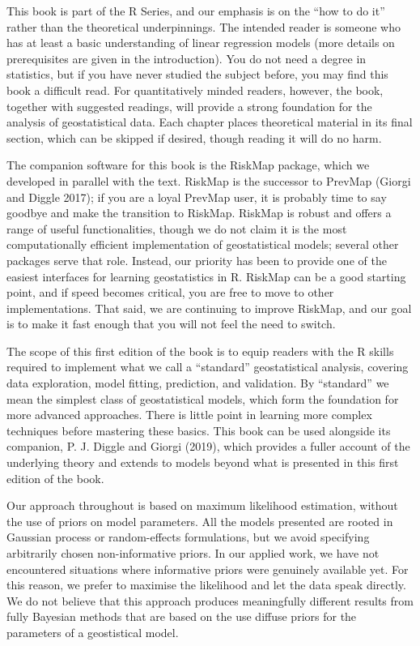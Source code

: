 \documentclass[
  letterpaper,
]{krantz}
\begin{document}
This book is part of the R Series, and our emphasis is on the ``how to
do it'' rather than the theoretical underpinnings. The intended reader
is someone who has at least a basic understanding of linear regression
models (more details on prerequisites are given in the introduction).
You do not need a degree in statistics, but if you have never studied
the subject before, you may find this book a difficult read. For
quantitatively minded readers, however, the book, together with
suggested readings, will provide a strong foundation for the analysis of
geostatistical data. Each chapter places theoretical material in its
final section, which can be skipped if desired, though reading it will
do no harm.

The companion software for this book is the RiskMap package, which we
developed in parallel with the text. RiskMap is the successor to PrevMap
(Giorgi and Diggle 2017); if you are a loyal PrevMap user, it is
probably time to say goodbye and make the transition to RiskMap. RiskMap
is robust and offers a range of useful functionalities, though we do not
claim it is the most computationally efficient implementation of
geostatistical models; several other packages serve that role. Instead,
our priority has been to provide one of the easiest interfaces for
learning geostatistics in R. RiskMap can be a good starting point, and
if speed becomes critical, you are free to move to other
implementations. That said, we are continuing to improve RiskMap, and
our goal is to make it fast enough that you will not feel the need to
switch.

The scope of this first edition of the book is to equip readers with the
R skills required to implement what we call a ``standard''
geostatistical analysis, covering data exploration, model fitting,
prediction, and validation. By ``standard'' we mean the simplest class
of geostatistical models, which form the foundation for more advanced
approaches. There is little point in learning more complex techniques
before mastering these basics. This book can be used alongside its
companion, P. J. Diggle and Giorgi (2019), which provides a fuller
account of the underlying theory and extends to models beyond what is
presented in this first edition of the book.

Our approach throughout is based on maximum likelihood estimation,
without the use of priors on model parameters. All the models presented
are rooted in Gaussian process or random-effects formulations, but we
avoid specifying arbitrarily chosen non-informative priors. In our
applied work, we have not encountered situations where informative
priors were genuinely available yet. For this reason, we prefer to
maximise the likelihood and let the data speak directly. We do not
believe that this approach produces meaningfully different results from
fully Bayesian methods that are based on the use diffuse priors for the
parameters of a geostistical model.
\end{document}
